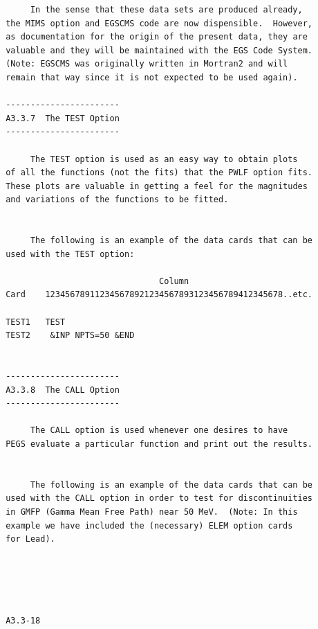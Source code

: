\newpage {} \begin{verbatim}
      In the sense that these data sets are produced already,
 the MIMS option and EGSCMS code are now dispensible.  However,
 as documentation for the origin of the present data, they are
 valuable and they will be maintained with the EGS Code System.
 (Note: EGSCMS was originally written in Mortran2 and will
 remain that way since it is not expected to be used again).

 -----------------------
 A3.3.7  The TEST Option
 -----------------------

      The TEST option is used as an easy way to obtain plots
 of all the functions (not the fits) that the PWLF option fits.
 These plots are valuable in getting a feel for the magnitudes
 and variations of the functions to be fitted.


      The following is an example of the data cards that can be
 used with the TEST option:

                                Column
 Card    123456789112345678921234567893123456789412345678..etc.

 TEST1   TEST
 TEST2    &INP NPTS=50 &END


 -----------------------
 A3.3.8  The CALL Option
 -----------------------

      The CALL option is used whenever one desires to have
 PEGS evaluate a particular function and print out the results.


      The following is an example of the data cards that can be
 used with the CALL option in order to test for discontinuities
 in GMFP (Gamma Mean Free Path) near 50 MeV.  (Note: In this
 example we have included the (necessary) ELEM option cards
 for Lead).





 A3.3-18
\end{verbatim}
\newpage {} 
